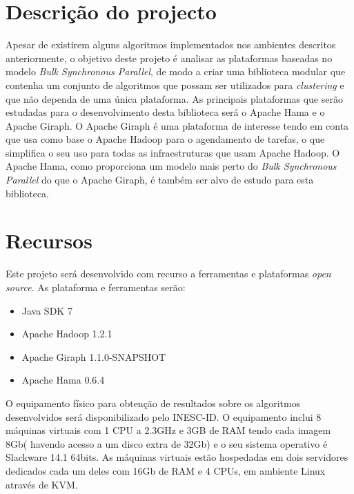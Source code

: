 \section{Descrição do projecto}
Apesar de existirem alguns algoritmos implementados nos ambientes descritos anteriormente, o objetivo deste projeto é analisar as plataformas
baseadas no modelo \textit{Bulk Synchronous Parallel}, de modo a criar uma biblioteca modular que contenha um conjunto de algoritmos que possam ser utilizados para \textit{clustering} e que não dependa de uma única plataforma. As principais plataformas que serão estudadas para o desenvolvimento desta biblioteca será o Apache Hama e o Apache Giraph. 
O Apache Giraph é uma plataforma de interesse tendo em conta que usa como base o Apache Hadoop para o agendamento de tarefas, o que simplifica o seu uso
para todas as infraestruturas que usam Apache Hadoop. O Apache Hama, como proporciona um modelo mais perto do \textit{Bulk Synchronous Parallel} do que o Apache Giraph, é também ser alvo de estudo para esta biblioteca.


\section{Recursos}
Este projeto será desenvolvido com recurso a ferramentas e plataformas \textit{open source}.
As plataforma e ferramentas serão:
\begin{itemize}
 \item Java SDK 7
 \item Apache Hadoop 1.2.1
 \item Apache Giraph 1.1.0-SNAPSHOT
 \item Apache Hama 0.6.4
\end{itemize}

O equipamento físico para obtenção de resultados sobre os algoritmos desenvolvidos será disponibilizado pelo INESC-ID. 
O equipamento inclui 8 máquinas virtuais com 1 CPU a 2.3GHz e 3GB de RAM tendo cada imagem 8Gb( havendo acesso a um disco extra de 32Gb) e o seu sistema operativo é Slackware 14.1 64bits.
As máquinas virtuais estão hospedadas em dois servidores dedicados cada um deles com 16Gb de RAM e 4 CPUs, em ambiente Linux através de KVM.

